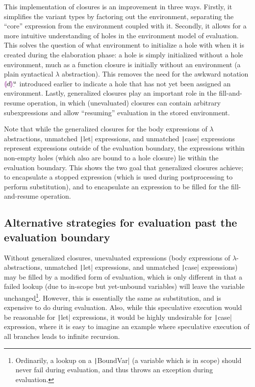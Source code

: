 This implementation of closures is an improvement in three ways. Firstly, it simplifies the variant types by factoring out the environment, separating the ``core'' expression from the environment coupled with it. Secondly, it allows for a more intuitive understanding of holes in the environment model of evaluation. This solves the question of what environment to initialize a hole with when it is created during the elaboration phase: a hole is simply initialized without a hole environment, much as a function closure is initially without an environment (a plain syntactical $\lambda$ abstraction). This removes the need for the awkward notation $\textcolor{violet}{\llparenthesis} d\textcolor{violet}{\rrparenthesis}_\cdot^u$ introduced earlier to indicate a hole that has not yet been assigned an environment. Lastly, generalized closures play an important role in the fill-and-resume operation, in which (unevaluated) closures can contain arbitrary subexpressions and allow ``resuming'' evaluation in the stored environment.

Note that while the generalized closures for the body expressions of $\lambda$ abstractions, unmatched \texttt|let| expressions, and unmatched \texttt|case| expressions represent expressions outside of the evaluation boundary, the expressions within non-empty holes (which also are bound to a hole closure) lie within the evaluation boundary. This shows the two goal that generalized closures achieve; to encapsulate a stopped expression (which is used during postprocessing to perform substitution), and to encapsulate an expression to be filled for the fill-and-resume operation.

\subsection{Alternative strategies for evaluation past the \\ evaluation boundary}
\label{sec:alt_strat_unevaluated}

Without generalized closures, unevaluated expressions (body expressions of $\lambda$-abstractions, unmatched \texttt|let| expressions, and unmatched \texttt|case| expressions) may be filled by a modified form of evaluation, which is only different in that a failed lookup (due to in-scope but yet-unbound variables) will leave the variable unchanged\footnote{Ordinarily, a lookup on a \texttt|BoundVar| (a variable which is in scope) should never fail during evaluation, and thus throws an exception during evaluation.}. However, this is essentially the same as substitution, and is expensive to do during evaluation. Also, while this speculative execution would be reasonable for \texttt|let| expressions, it would be highly undesirable for \texttt|case| expression, where it is easy to imagine an example where speculative execution of all branches leads to infinite recursion.

